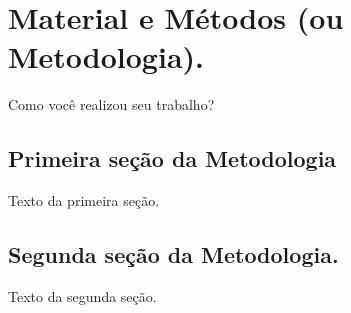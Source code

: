 \chapter{Material e Métodos (ou Metodologia).}

Como você realizou seu trabalho?

\section{Primeira seção da Metodologia}

Texto da primeira seção.

\section{Segunda seção da Metodologia.}

Texto da segunda seção.
